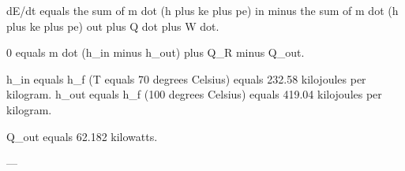 dE/dt equals the sum of m dot (h plus ke plus pe) in minus the sum of m dot (h plus ke plus pe) out plus Q dot plus W dot.  

0 equals m dot (h_in minus h_out) plus Q_R minus Q_out.  

h_in equals h_f (T equals 70 degrees Celsius) equals 232.58 kilojoules per kilogram.  
h_out equals h_f (100 degrees Celsius) equals 419.04 kilojoules per kilogram.  

Q_out equals 62.182 kilowatts.  

---